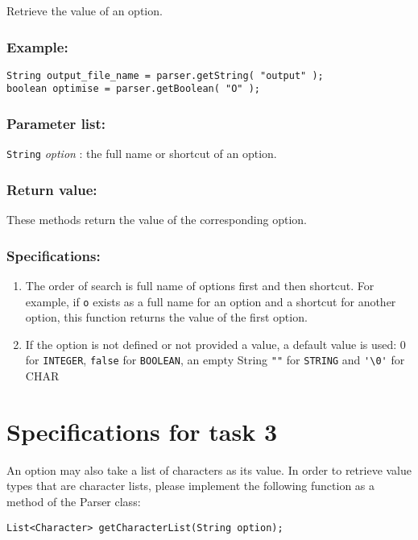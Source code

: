 \documentclass{article}
\begin{document}
Retrieve the value of an option.

\subsubsection*{Example:}
\begin{lstlisting}
String output_file_name = parser.getString( "output" );
boolean optimise = parser.getBoolean( "O" );
\end{lstlisting}

\subsubsection*{Parameter list:}

\lstinline{String} \textsl{option} : the full name or shortcut of an option.

\subsubsection*{Return value:}

These methods return the value of the corresponding option.

\subsubsection*{Specifications:}
\begin{enumerate}
\item The order of search is full name of options first and then shortcut. For example, if \lstinline{o}
exists as a full name for an option and a shortcut for another option, this function returns
the value of the first option.
\item If the option is not defined or not provided a value, a default
  value is used: 0 for \lstinline{INTEGER}, \lstinline{false} for
  \lstinline{BOOLEAN}, an empty String \lstinline{""} for \lstinline{STRING}
  and \lstinline{'\0'} for CHAR
\end{enumerate}

\section{Specifications for task 3}

An option may also take a list of characters as its value. In order to
retrieve value types that are character lists, please implement the
following function as a method of the Parser class:
\begin{lstlisting}
List<Character> getCharacterList(String option);
\end{lstlisting}
\end{document}
